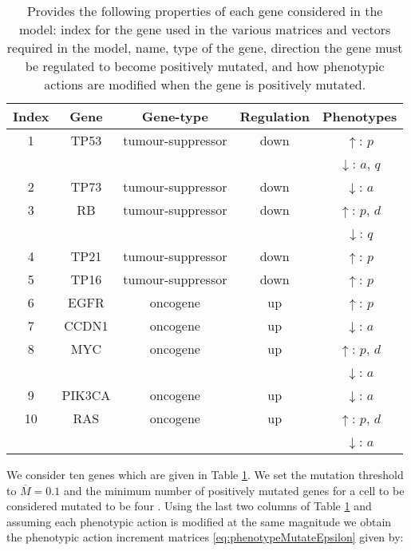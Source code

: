 \documentclass[\main/thesis.tex]{subfiles}
\begin{document}
\begin{table}
\centering
\begin{tabular}{| c c c c c |}
	\hline
	Index & Gene & Gene-type & Regulation & Phenotypes \\
	\hline\hline
	1 & TP53 & tumour-suppressor & down & $\uparrow$: $p$ \\
	 & & & & $\downarrow$: $a$, $q$ \\
	\hline
	2 & TP73 & tumour-suppressor & down & $\downarrow$: $a$ \\
	\hline
	3 & RB & tumour-suppressor & down & $\uparrow$: $p$, $d$ \\
	 & & & & $\downarrow$: $q$ \\
	\hline
	4 & TP21 & tumour-suppressor & down & $\uparrow$: $p$ \\
	\hline
	5 & TP16 & tumour-suppressor & down & $\uparrow$: $p$ \\
	\hline
	6 & EGFR & oncogene & up & $\uparrow$: $p$ \\
	\hline
	7 & CCDN1 & oncogene & up & $\downarrow$: $a$ \\
	\hline
	8 & MYC & oncogene & up & $\uparrow$: $p$, $d$\\
	 & & & & $\downarrow$: $a$ \\
	\hline
	9 & PIK3CA & oncogene & up & $\downarrow$: $a$ \\
	\hline
	10 & RAS & oncogene & up & $\uparrow$: $p$, $d$ \\
	 & & & & $\downarrow$: $a$ \\
	\hline
\end{tabular}
\caption{Provides the following properties of each gene considered in the model: index for the gene used in the various matrices and vectors required in the model, name, type of the gene, direction the gene must be regulated to become positively mutated, and how phenotypic actions are modified when the gene is positively mutated.}
\label{table:genes}
\end{table}
We consider ten genes which are given in Table \ref{table:genes}. We set the mutation threshold to $\overline{M} {=} 0.1$ and the minimum number of positively mutated genes for a cell to be considered mutated to be four \cite{Anandakrishnan}. Using the last two columns of Table \ref{table:genes} and assuming each phenotypic action is modified at the same magnitude we obtain the phenotypic action increment matrices \eqref{eq:phenotypeMutateEpsilon} given by:
\end{document}
